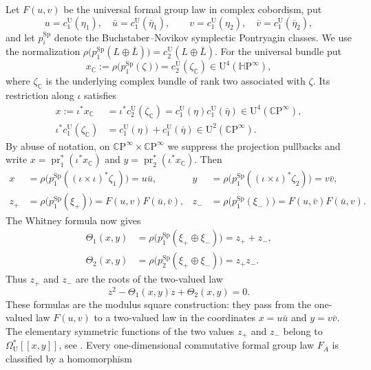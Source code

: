 \documentclass[14pt,dvipsnames]{extarticle}
\numberwithin{equation}{subsection}
\theoremstyle{plain}
\theoremstyle{definition}
\theoremstyle{definition}
\DeclareMathOperator{\pr}{pr}
\newcommand{\U}{\mathrm U}
\newcommand{\CP}{\mathbb{C}\mathrm P}
\newcommand{\HP}{\mathbb{H}\mathrm P}
\newcommand{\Sp}{\mathrm{Sp}}
\begin{document}
Let $F(u,v)$ be the universal formal group law in complex cobordism, put
\[
 u=c_1^{\U}(\eta_1),
 \quad \bar u=c_1^{\U}(\bar\eta_1),
 \qquad
 v=c_1^{\U}(\eta_2),
 \quad \bar v=c_1^{\U}(\bar\eta_2),
\]
and let $p_i^{\Sp}$ denote the Buchstaber--Novikov symplectic Pontryagin
classes. We use the normalization
$\rho\bigl(p_1^{\Sp}(L\oplus\bar L)\bigr)=c_2^{\U}(L\oplus\bar L)$.
For the universal bundle put
\[
 x_{\mathbb C}:=\rho\bigl(p_1^{\Sp}(\zeta)\bigr)
 =c_2^{\U}(\zeta_{\mathbb C})\in\U^4(\HP^\infty),
\]
where $\zeta_{\mathbb C}$ is the underlying complex bundle of rank two
associated with $\zeta$. Its restriction along $\iota$ satisfies
\[
 \begin{aligned}
 x:=\iota^*x_{\mathbb C}
 &=\iota^*c_2^{\U}(\zeta_{\mathbb C})
 =c_1^{\U}(\eta)c_1^{\U}(\bar\eta)
 \in\U^4(\CP^\infty),\\
 \iota^*c_1^{\U}(\zeta_{\mathbb C})
 &=c_1^{\U}(\eta)+c_1^{\U}(\bar\eta)\in\U^2(\CP^\infty).
 \end{aligned}
\]
By abuse of notation, on $\CP^\infty\times\CP^\infty$ we suppress the
projection pullbacks and write
$x=\pr_1^*(\iota^*x_{\mathbb C})$ and
$y=\pr_2^*(\iota^*x_{\mathbb C})$.
Then
\[
 \begin{aligned}
 x&=\rho\bigl(p_1^{\Sp}((\iota\times\iota)^*\zeta_1)\bigr)=u\bar u,
 &
 y&=\rho\bigl(p_1^{\Sp}((\iota\times\iota)^*\zeta_2)\bigr)=v\bar v,\\
 z_+&=\rho\bigl(p_1^{\Sp}(\xi_+)\bigr)
     =F(u,v)F(\bar u,\bar v),
 &
 z_-&=\rho\bigl(p_1^{\Sp}(\xi_-)\bigr)
     =F(u,\bar v)F(\bar u,v).
 \end{aligned}
\]
The Whitney formula now gives
\[
 \begin{aligned}
 \Theta_1(x,y)
  &=\rho\bigl(p_1^{\Sp}(\xi_+\oplus\xi_-)\bigr)=z_++z_-,\\
 \Theta_2(x,y)
  &=\rho\bigl(p_2^{\Sp}(\xi_+\oplus\xi_-)\bigr)=z_+z_-.
 \end{aligned}
\]
Thus $z_+$ and $z_-$ are the roots of the two-valued law
\begin{equation}\label{universal_two_valued_formal_group}
 z^2-\Theta_1(x,y)z+\Theta_2(x,y)=0.
\end{equation}
These formulas are the modulus square construction: they pass from the
one-valued law $F(u,v)$ to a two-valued law in the coordinates
$x=u\bar u$ and $y=v\bar v$. The elementary symmetric functions of the two
values $z_{+}$ and $z_{-}$ belong to $\Omega_{\mathrm U}^{\ast}[[x,y]]$, see \cite{BN71}. Every
one-dimensional commutative formal group law $F_A$ is classified by a homomorphism
\end{document}
